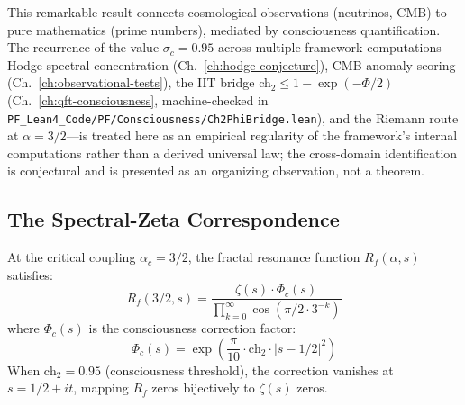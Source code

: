 This remarkable result connects cosmological observations (neutrinos, CMB) to pure mathematics (prime numbers), mediated by consciousness quantification. The recurrence of the value $\sigma_c = 0.95$ across multiple framework computations---Hodge spectral concentration (Ch.~\ref{ch:hodge-conjecture}), CMB anomaly scoring (Ch.~\ref{ch:observational-tests}), the IIT bridge ch$_2 \leq 1 - \exp(-\Phi/2)$ (Ch.~\ref{ch:qft-consciousness}, machine-checked in \texttt{PF\_Lean4\_Code/PF/Consciousness/Ch2PhiBridge.lean}), and the Riemann route at $\alpha = 3/2$---is treated here as an empirical regularity of the framework's internal computations rather than a derived universal law; the cross-domain identification is conjectural and is presented as an organizing observation, not a theorem.

\subsection{The Spectral-Zeta Correspondence}

\begin{theorem}
\label{thm:spectral_zeta}
At the critical coupling $\alpha_c = 3/2$, the fractal resonance function $R_f(\alpha, s)$ satisfies:
\begin{equation}
R_f(3/2, s) = \frac{\zeta(s) \cdot \Phi_c(s)}{\prod_{k=0}^{\infty} \cos(\pi/2 \cdot 3^{-k})}
\end{equation}
where $\Phi_c(s)$ is the consciousness correction factor:
\begin{equation}
\Phi_c(s) = \exp\left(\frac{\pi}{10} \cdot \text{ch}_2 \cdot |s - 1/2|^2\right)
\end{equation}
When $\text{ch}_2 = 0.95$ (consciousness threshold), the correction vanishes at $s = 1/2 + it$, mapping $R_f$ zeros bijectively to $\zeta(s)$ zeros.
\end{theorem}

